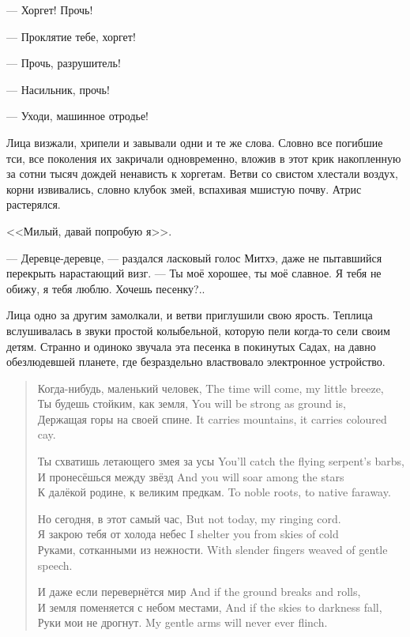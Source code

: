 --- Хоргет!
Прочь!

--- Проклятие тебе, хоргет!

--- Прочь, разрушитель!

--- Насильник, прочь!

--- Уходи, машинное отродье!

Лица визжали, хрипели и завывали одни и те же слова.
Словно все погибшие тси, все поколения их закричали одновременно, вложив в этот крик накопленную за сотни тысяч дождей ненависть к хоргетам.
Ветви со свистом хлестали воздух, корни извивались, словно клубок змей, вспахивая мшистую почву.
Атрис растерялся.

<<Милый, давай попробую я>>.

--- Деревце-деревце, --- раздался ласковый голос Митхэ, даже не пытавшийся перекрыть нарастающий визг.
--- Ты моё хорошее, ты моё славное.
Я тебя не обижу, я тебя люблю.
Хочешь песенку?..

Лица одно за другим замолкали, и ветви приглушили свою ярость.
Теплица вслушивалась в звуки простой колыбельной, которую пели когда-то сели своим детям.
Странно и одиноко звучала эта песенка в покинутых Садах, на давно обезлюдевшей планете, где безраздельно властвовало электронное устройство.

\begin{verse}
{Когда-нибудь, маленький человек,}
{The time will come, my little breeze,}\\
{Ты будешь стойким, как земля,}
{You will be strong as ground is,}\\
{Держащая горы на своей спине.}
{It carries mountains, it carries coloured cay.}

{Ты схватишь летающего змея за усы}
{You'll catch the flying serpent's barbs,}\\
{И пронесёшься между звёзд}
{And you will soar among the stars}\\
{К далёкой родине, к великим предкам.}
{To noble roots, to native faraway.}

{Но сегодня, в этот самый час,}
{But not today, my ringing cord.}\\
{Я закрою тебя от холода небес}
{I shelter you from skies of cold}\\
{Руками, сотканными из нежности.}
{With slender fingers weaved of gentle speech.}

{И даже если перевернётся мир}
{And if the ground breaks and rolls,}\\
{И земля поменяется с небом местами,}
{And if the skies to darkness fall,}\\
{Руки мои не дрогнут.}
{My gentle arms will never ever flinch.}
\end{verse}


